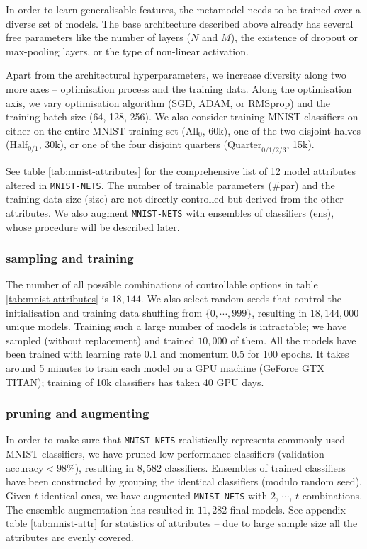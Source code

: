 \documentclass{article} %
\newcommand{\metamnist}{\texttt{MNIST-NETS}\xspace}
\begin{document}
In order to learn generalisable features, the metamodel needs to be trained over a diverse set of models. The base architecture described above already has several free parameters like the number of \textbf{}layers ($N$ and $M$), the existence of dropout or max-pooling layers, or the type of non-linear activation. 

Apart from the architectural hyperparameters, we increase diversity along two more axes -- optimisation process and the training data. Along the optimisation axis, we vary optimisation algorithm (SGD, ADAM, or RMSprop) and the training batch size (64, 128, 256). We also consider training MNIST classifiers on either on the entire MNIST training set ($\text{All}_0$, 60k), one of the two disjoint halves ($\text{Half}_{0/1}$, 30k), or one of the four disjoint quarters ($\text{Quarter}_{0/1/2/3}$, 15k).

See table \ref{tab:mnist-attributes} for the comprehensive list of 12 model attributes altered in \metamnist. The number of trainable parameters (\#\ignorespaces par) and the training data size (size) are not directly controlled but derived from the other attributes. We also augment \metamnist with ensembles of classifiers (ens), whose procedure will be described later. 



\subsubsection*{sampling and training}

The number of all possible combinations of controllable options in table \ref{tab:mnist-attributes} is $18,144$. We also select random seeds that control the initialisation and training data shuffling from $\{0,\cdots,999\}$, resulting in $18,144,000$ unique models.  Training such a large number of models is intractable; we have sampled (without replacement) and trained $10,000$ of them. All the models have been trained with learning rate $0.1$ and momentum $0.5$ for 100 epochs. It takes around 5 minutes to train each model on a GPU machine (GeForce GTX TITAN); training of 10k classifiers has taken 40 GPU days.

\subsubsection*{pruning and augmenting}

In order to make sure that \metamnist realistically represents commonly used MNIST classifiers, we have pruned low-performance classifiers (validation accuracy$<98\%$), resulting in $8,582$ classifiers. Ensembles of trained classifiers have been constructed by grouping the identical classifiers (modulo random seed). Given $t$ identical ones, we have augmented \metamnist with 2, $\cdots$, $t$ combinations. The ensemble augmentation has resulted in $11,282$ final models. See appendix table \ref{tab:mnist-attr} for statistics of attributes -- due to large sample size all the attributes are evenly covered. 
\end{document}
